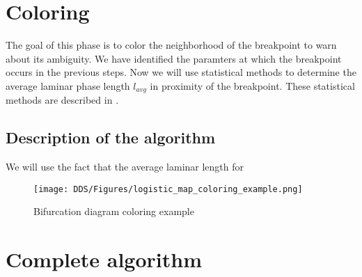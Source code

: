 

\section{Coloring}
The goal of this phase is to color the neighborhood of the breakpoint to warn about its ambiguity.
We have identified the paramters at which the breakpoint occurs in the previous steps.
Now we will use statistical methods to determine the average laminar phase length $l_{avg}$ in proximity of the breakpoint.
These statistical methods are described in \cite{Elaskar2022}.

\subsection{Description of the algorithm}
We will use the fact that the average laminar length for 

\begin{figure}[!h]
    \centering
    \texttt{[image: DDS/Figures/logistic\_map\_coloring\_example.png]}
    \caption{Bifurcation diagram coloring example}
    \label{fig:coloring_example}
\end{figure}

\section{Complete algorithm}

\endinput